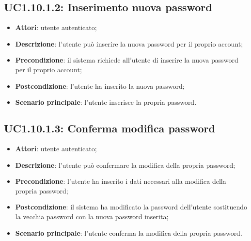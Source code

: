 \subsection{UC1.10.1.2: Inserimento nuova password}
\label{UC1.10.1.2}
\begin{itemize}
\item \textbf{Attori}: utente autenticato;
\item \textbf{Descrizione}: l’utente può inserire la nuova password per il proprio account;
\item \textbf{Precondizione}: il sistema richiede all’utente di inserire la nuova password per il proprio account;
\item \textbf{Postcondizione}: l'utente ha inserito la nuova password;
\item \textbf{Scenario principale}:
l’utente inserisce la propria password.
\end{itemize}
\subsection{UC1.10.1.3: Conferma modifica password}
\label{UC1.10.1.3}
\begin{itemize}
\item \textbf{Attori}: utente autenticato;
\item \textbf{Descrizione}: l’utente può confermare la modifica della propria password;
\item \textbf{Precondizione}: l'utente ha inserito i dati necessari alla modifica della propria password;
\item \textbf{Postcondizione}: il sistema ha modificato la password dell’utente sostituendo la vecchia password con la nuova password inserita;
\item \textbf{Scenario principale}:
l’utente conferma la modifica della propria password.
\end{itemize}
